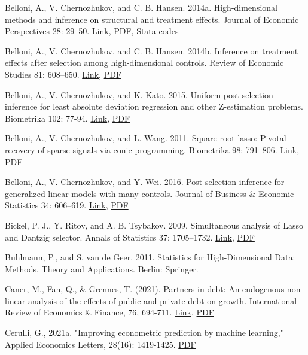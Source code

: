 {Belloni, A., V. Chernozhukov, and C. B. Hansen. 2014a. High-dimensional methods and inference on structural and
treatment effects. Journal of Economic Perspectives 28: 29–50. \href{https://doi.org/10.1257/jep.28.2.29}{Link}, \href{http://sci-hub.ren/10.1257/jep.28.2.29}{PDF}, \href{https://academic.oup.com/restud/article/81/2/608/1523757}{Stata-codes}

Belloni, A., V. Chernozhukov, and C. B. Hansen. 2014b. Inference on treatment effects after selection among high-dimensional controls. Review of Economic Studies 81: 608–650. \href{https://doi.org/10.1093/restud/rdt044}{Link}, \href{http://sci-hub.ren/10.1093/restud/rdt044}{PDF}

Belloni, A., V. Chernozhukov, and K. Kato. 2015. Uniform post-selection inference for least absolute deviation regression and other Z-estimation problems. Biometrika 102: 77-94. \href{https://doi.org/10.1093/biomet/asu056}{Link}, \href{http://sci-hub.ren/10.1093/biomet/asu056}{PDF}

Belloni, A., V. Chernozhukov, and L. Wang. 2011. Square-root lasso: Pivotal recovery of sparse signals via conic programming. Biometrika 98: 791–806. \href{https://doi.org/10.1093/biomet/asr043}{Link}, \href{http://sci-hub.ren/10.1093/biomet/asr043}{PDF}

Belloni, A., V. Chernozhukov, and Y. Wei. 2016. Post-selection inference for generalized linear models with many controls. Journal of Business \& Economic Statistics 34: 606–619.  \href{https://doi.org/10.1080/07350015.2016.1166116}{Link}, \href{http://sci-hub.ren/10.1080/07350015.2016.1166116}{PDF}


Bickel, P. J., Y. Ritov, and A. B. Tsybakov. 2009. Simultaneous analysis of Lasso and Dantzig selector. Annals of
Statistics 37: 1705–1732. \href{https://doi.org/10.1214/08-A}{Link}, \href{http://sci-hub.ren/10.1214/08-A}{PDF}

Buhlmann, P., and S. van de Geer. 2011. Statistics for High-Dimensional Data: Methods, Theory and Applications.
Berlin: Springer.

Caner, M., Fan, Q., \& Grennes, T. (2021). Partners in debt: An endogenous non-linear analysis of the effects of public and private debt on growth. International Review of Economics \& Finance, 76, 694-711. \href{https://doi.org/10.1016/j.iref.2021.07.010}{Link}, \href{http://sci-hub.ren/10.1016/j.iref.2021.07.010}{PDF}

Cerulli, G., 2021a. "Improving econometric prediction by machine learning," Applied Economics Letters, 28(16): 1419-1425. \href{http://sci-hub.ren/10.1080/13504851.2020.1820939}{PDF}

}
